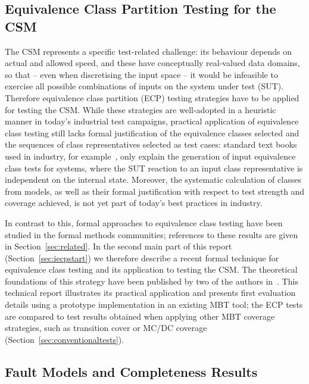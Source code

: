 \subsection{Equivalence Class Partition Testing for the CSM}

The CSM represents a specific test-related challenge: its behaviour depends on actual and allowed speed, and these have conceptually real-valued data domains, so that -- even when   discretising
the input space -- it would be infeasible to exercise all possible combinations of 
inputs on the system under test (SUT). Therefore equivalence class partition (ECP)
 testing strategies have 
to be applied for testing the CSM. While these strategies are well-adopted  in a heuristic manner
in today's industrial test campaigns, practical application of equivalence class testing still lacks 
formal justification of the equivalence classes selected and the sequences of class representatives 
selected as test cases: standard text books used in industry, for example~\cite{spillner2006}, 
only explain the generation of input equivalence class tests for   systems, where the 
SUT reaction to an input class representative is independent on the internal state. Moreover, the systematic calculation of classes from models, as well as their formal justification with respect to
test strength and coverage achieved, is not yet part of today's best practices in industry. 

In contrast to this, formal approaches to equivalence class testing have been studied in the formal methods communities; references to these results  are given in Section~\ref{sec:related}.
In the second main part of this report (Section~\ref{sec:iecpstart}) we therefore describe a recent formal technique for equivalence class testing and its application to testing the CSM. The theoretical 
foundations of this strategy have been published by two of the authors in~\cite{peleska2013ictss}. 
This technical report illustrates its practical application and presents first evaluation details using a 
prototype implementation in an existing MBT tool; the ECP tests are  compared to test results obtained when applying other MBT coverage strategies, such as transition cover or MC/DC coverage (Section~\ref{sec:conventionaltests}). 


\subsection{Fault Models and Completeness Results}


